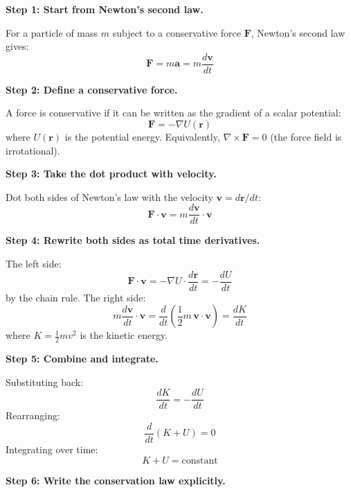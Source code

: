 \textbf{Step 1: Start from Newton's second law.}

For a particle of mass $m$ subject to a conservative force $\mathbf{F}$, Newton's second law gives:
\begin{equation}
\mathbf{F} = m\mathbf{a} = m\frac{d\mathbf{v}}{dt}
\end{equation}

\textbf{Step 2: Define a conservative force.}

A force is conservative if it can be written as the gradient of a scalar potential:
\begin{equation}
\mathbf{F} = -\nabla U(\mathbf{r})
\end{equation}
where $U(\mathbf{r})$ is the potential energy. Equivalently, $\nabla \times \mathbf{F} = 0$ (the force field is irrotational).

\textbf{Step 3: Take the dot product with velocity.}

Dot both sides of Newton's law with the velocity $\mathbf{v} = d\mathbf{r}/dt$:
\begin{equation}
\mathbf{F} \cdot \mathbf{v} = m\frac{d\mathbf{v}}{dt} \cdot \mathbf{v}
\end{equation}

\textbf{Step 4: Rewrite both sides as total time derivatives.}

The left side:
\begin{equation}
\mathbf{F} \cdot \mathbf{v} = -\nabla U \cdot \frac{d\mathbf{r}}{dt} = -\frac{dU}{dt}
\end{equation}
by the chain rule. The right side:
\begin{equation}
m\frac{d\mathbf{v}}{dt} \cdot \mathbf{v} = \frac{d}{dt}\left(\frac{1}{2}m\,\mathbf{v} \cdot \mathbf{v}\right) = \frac{dK}{dt}
\end{equation}
where $K = \frac{1}{2}mv^2$ is the kinetic energy.

\textbf{Step 5: Combine and integrate.}

Substituting back:
\begin{equation}
\frac{dK}{dt} = -\frac{dU}{dt}
\end{equation}
Rearranging:
\begin{equation}
\frac{d}{dt}(K + U) = 0
\end{equation}
Integrating over time:
\begin{equation}
K + U = \text{constant}
\end{equation}

\textbf{Step 6: Write the conservation law explicitly.}

